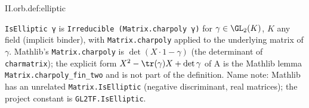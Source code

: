 \begin{definition}
\end{definition}
\begin{tfformal}{II.orb.def:elliptic}
\begin{tffidelity}
\texttt{IsElliptic γ} is \texttt{Irreducible (Matrix.charpoly γ)} for $\gamma\in\GL_2(K)$, $K$ any field (implicit binder), with \texttt{Matrix.charpoly} applied to the underlying matrix of $\gamma$. Mathlib's \texttt{Matrix.charpoly} is $\det(X\cdot1-\gamma)$ (the determinant of \texttt{charmatrix}); the explicit form $X^2-\tr(\gamma)X+\det\gamma$ of A is the Mathlib lemma \texttt{Matrix.charpoly\_fin\_two} and is not part of the definition. Name note: Mathlib has an unrelated \texttt{Matrix.IsElliptic} (negative discriminant, real matrices); the project constant is \texttt{GL2TF.IsElliptic}.
\end{tffidelity}
\end{tfformal}

